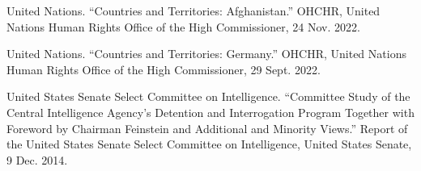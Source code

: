\documentclass{article}
\begin{document}
United Nations. “Countries and Territories: Afghanistan.” OHCHR, United Nations Human Rights Office of the High Commissioner, 24 Nov. 2022. 

United Nations. “Countries and Territories: Germany.” OHCHR, United Nations Human Rights Office of the High Commissioner, 29 Sept. 2022.

United States Senate Select Committee on Intelligence. “Committee Study of the Central Intelligence Agency's Detention and Interrogation Program Together with Foreword by Chairman Feinstein and Additional and Minority Views.” Report of the United States Senate Select Committee on Intelligence, United States Senate, 9 Dec. 2014.
\end{document}
